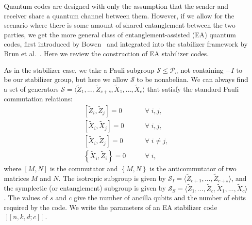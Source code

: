 \documentclass[]{amsart}
\begin{document}
Quantum codes are designed with only the assumption that the sender and receiver share a quantum channel between them.
However, if we allow for the scenario where there is some amount of shared entanglement between the two parties, we get the more general class of entanglement-assisted (EA) quantum codes, first introduced by Bowen~\cite{Bow2002} and integrated into the stabilizer framework by Brun et al.~\cite{BDH2006,BDH2014}.
Here we review the construction of EA stabilizer codes.

As in the stabilizer case, we take a Pauli subgroup $\mathcal{S}\leq\mathcal{P}_n$ not containing $-I$ to be our stabilizer group, but here we allow $\mathcal{S}$ to be nonabelian.
We can always find a set of generators $\mathcal{S}=\langle\widetilde{Z}_1,\dots,\widetilde{Z}_{c+s},\widetilde{X}_1,\dots,\widetilde{X}_c\rangle$ that satisfy the standard Pauli commutation relations:
\begin{align}
    \left[\widetilde{Z}_i,\widetilde{Z}_j\right]=0 \quad & \quad \forall\;i,j, \\
    \left[\widetilde{X}_i,\widetilde{X}_j\right]=0 \quad & \quad \forall\;i,j, \\
    \left[\widetilde{X}_i,\widetilde{Z}_j\right]=0 \quad & \quad \forall\;i\neq j, \\
    \left\{\widetilde{X}_i,\widetilde{Z}_i\right\}=0 \quad & \quad \forall\;i,
\end{align}
where $\left[M,N\right]$ is the commutator and $\left\{M,N\right\}$ is the anticommutator of two matrices $M$ and $N$.
The isotropic subgroup is given by $\mathcal{S}_I=\langle\widetilde{Z}_{c+1},\dots,\widetilde{Z}_{c+s}\rangle$, and the symplectic (or entanglement) subgroup is given by $\mathcal{S}_S=\langle\widetilde{Z}_1,\dots,\widetilde{Z}_{c},\widetilde{X}_1,\dots,\widetilde{X}_c\rangle$.
The values of $s$ and $c$ give the number of ancilla qubits and the number of ebits required by the code.
We write the parameters of an EA stabilizer code $\left[\!\left[n,k,d;c\right]\!\right]$.
\end{document}
